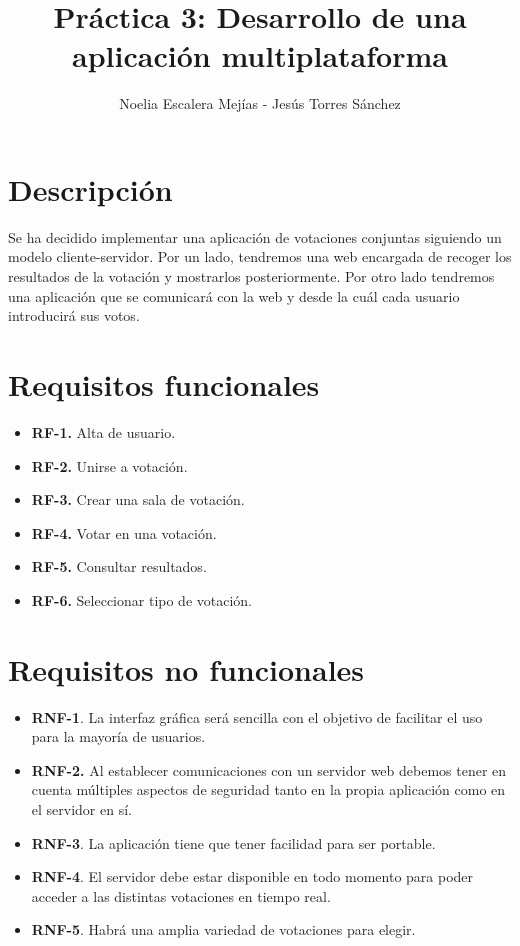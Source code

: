 \documentclass{article}
\begin{document}
\title{
	\textbf{Práctica 3: Desarrollo de una aplicación multiplataforma}
}
\author{Noelia Escalera Mejías - Jesús Torres Sánchez}
\maketitle
\tableofcontents
\newpage
\section{Descripción}
Se ha decidido implementar una aplicación de votaciones conjuntas siguiendo un modelo cliente-servidor. Por un lado, tendremos una web encargada de recoger los resultados de la votación y mostrarlos posteriormente. Por otro lado tendremos una aplicación que se comunicará con la web y desde la cuál cada usuario introducirá sus votos.

\section{Requisitos funcionales}
\begin{itemize}
	\item \textbf{RF-1.} Alta de usuario.
	\item \textbf{RF-2.} Unirse a votación.
	\item \textbf{RF-3.} Crear una sala de votación.
	\item \textbf{RF-4.} Votar en una votación.
	\item \textbf{RF-5.} Consultar resultados.
	\item \textbf{RF-6.} Seleccionar tipo de votación. \\
\end{itemize}

\section{Requisitos no funcionales}
\begin{itemize}
	\item \textbf{RNF-1}. La interfaz gráfica será sencilla con el objetivo de facilitar el uso para la mayoría de usuarios.
	\item \textbf{RNF-2.} Al establecer comunicaciones con un servidor web debemos tener
	en cuenta múltiples aspectos de seguridad tanto en la propia aplicación
	como en el servidor en sí.
	\item \textbf{RNF-3}. La aplicación tiene que tener facilidad para ser portable.
	\item \textbf{RNF-4}. El servidor debe estar disponible en todo momento para poder
	acceder a las distintas votaciones en tiempo real.
	\item \textbf{RNF-5}. Habrá una amplia variedad de votaciones para elegir.
\end{itemize}
\end{document}
